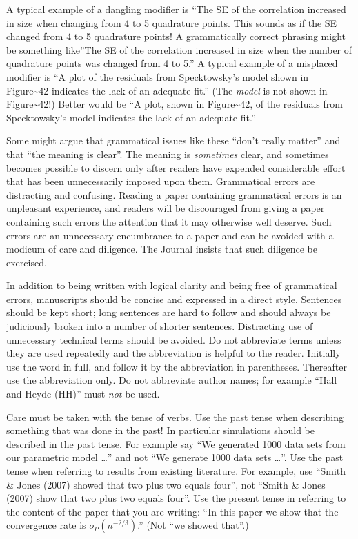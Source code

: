 \documentclass[
  times,
  doublespace]{anzsauth}
\begin{document}
A typical example of a dangling modifier is ``The SE of the correlation
increased in size when changing from 4 to 5 quadrature points. This
sounds as if the SE changed from 4 to 5 quadrature points! A
grammatically correct phrasing might be something like''The SE of the
correlation increased in size when the number of quadrature points was
changed from 4 to 5.'' A typical example of a misplaced modifier is ``A
plot of the residuals from Specktowsky's model shown in
Figure\textasciitilde42 indicates the lack of an adequate fit.'' (The
\emph{model} is not shown in Figure\textasciitilde42!) Better would be
``A plot, shown in Figure\textasciitilde42, of the residuals from
Specktowsky's model indicates the lack of an adequate fit.''

Some might argue that grammatical issues like these ``don't really
matter'' and that ``the meaning is clear''. The meaning is
\emph{sometimes} clear, and sometimes becomes possible to discern only
after readers have expended considerable effort that has been
unnecessarily imposed upon them. Grammatical errors are distracting and
confusing. Reading a paper containing grammatical errors is an
unpleasant experience, and readers will be discouraged from giving a
paper containing such errors the attention that it may otherwise well
deserve. Such errors are an unnecessary encumbrance to a paper and can
be avoided with a modicum of care and diligence. The Journal insists
that such diligence be exercised.

In addition to being written with logical clarity and being free of
grammatical errors, manuscripts should be concise and expressed in a
direct style. Sentences should be kept short; long sentences are hard to
follow and should always be judiciously broken into a number of shorter
sentences. Distracting use of unnecessary technical terms should be
avoided. Do not abbreviate terms unless they are used repeatedly and the
abbreviation is helpful to the reader. Initially use the word in full,
and follow it by the abbreviation in parentheses. Thereafter use the
abbreviation only. Do not abbreviate author names; for example ``Hall
and Heyde (HH)'' must \emph{not} be used.

Care must be taken with the tense of verbs. Use the past tense when
describing something that was done in the past! In particular
simulations should be described in the past tense. For example say ``We
generated 1000 data sets from our parametric model \ldots'' and not ``We
generate 1000 data sets \ldots''. Use the past tense when referring to
results from existing literature. For example, use ``Smith \& Jones
(2007) showed that two plus two equals four'', not ``Smith \& Jones
(2007) show that two plus two equals four''. Use the present tense in
referring to the content of the paper that you are writing: ``In this
paper we show that the convergence rate is \(o_P(n^{-2/3})\).'' (Not
``we showed that''.)
\end{document}
